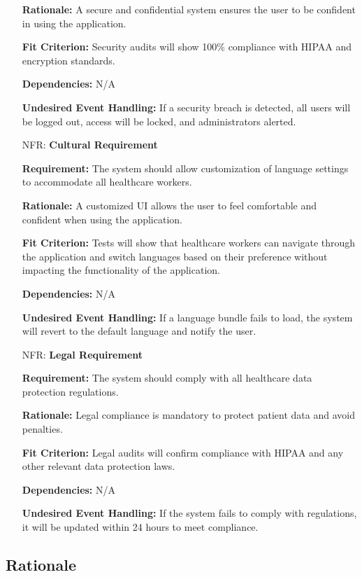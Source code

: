 \documentclass[12pt]{article}
\newcounter{nfrnum} %
\begin{document}
\begin{itemize}
    \textbf{Rationale:} A secure and confidential system ensures the user to be confident in using the application.

    \textbf{Fit Criterion:} Security audits will show 100\% compliance with HIPAA and encryption standards.  

    \textbf{Dependencies:} N/A

    \textbf{Undesired Event Handling:} If a security breach is detected, all users will be logged out, access will be locked, and administrators alerted.

\item[NFR\refstepcounter{nfrnum}\thenfrnum \label{NFR_Cultural}:] \textbf{Cultural Requirement}

    \textbf{Requirement:} The system should allow customization of language settings to accommodate all healthcare workers.

    \textbf{Rationale:} A customized UI allows the user to feel comfortable and confident when using the application.

    \textbf{Fit Criterion:} Tests will show that healthcare workers can navigate through the application and switch languages based on their preference without impacting the functionality of the application.

    \textbf{Dependencies:} N/A

    \textbf{Undesired Event Handling:} If a language bundle fails to load, the system will revert to the default language and notify the user.

\item[NFR\refstepcounter{nfrnum}\thenfrnum \label{NFR_Legal}:] \textbf{Legal Requirement}

    \textbf{Requirement:} The system should comply with all healthcare data protection regulations. 

    \textbf{Rationale:} Legal compliance is mandatory to protect patient data and avoid penalties.  

    \textbf{Fit Criterion:} Legal audits will confirm compliance with HIPAA and any other relevant data protection laws.  

    \textbf{Dependencies:} N/A

    \textbf{Undesired Event Handling:} If the system fails to comply with regulations, it will be updated within 24 hours to meet compliance.

\end{itemize}

\subsection{Rationale}
\end{document}
